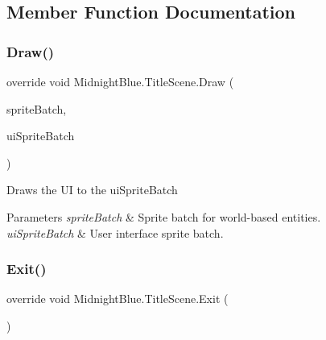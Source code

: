 \subsection{Member Function Documentation}
\hypertarget{class_midnight_blue_1_1_title_scene_a03fa806a36226ec5fd0ce09870109c18}{}\label{class_midnight_blue_1_1_title_scene_a03fa806a36226ec5fd0ce09870109c18} 
\subsubsection{\texorpdfstring{Draw()}{Draw()}}
{\footnotesize\ttfamily override void Midnight\+Blue.\+Title\+Scene.\+Draw (\begin{DoxyParamCaption}\item[{Sprite\+Batch}]{sprite\+Batch,  }\item[{Sprite\+Batch}]{ui\+Sprite\+Batch }\end{DoxyParamCaption})\hspace{0.3cm}{\ttfamily [inline]}}



Draws the UI to the ui\+Sprite\+Batch 


\begin{DoxyParams}{Parameters}
{\em sprite\+Batch} & Sprite batch for world-\/based entities.\\
\hline
{\em ui\+Sprite\+Batch} & User interface sprite batch.\\
\hline
\end{DoxyParams}
\hypertarget{class_midnight_blue_1_1_title_scene_aed29e37e9f849cc8f8443bae057a8eb8}{}\label{class_midnight_blue_1_1_title_scene_aed29e37e9f849cc8f8443bae057a8eb8} 
\subsubsection{\texorpdfstring{Exit()}{Exit()}}
{\footnotesize\ttfamily override void Midnight\+Blue.\+Title\+Scene.\+Exit (\begin{DoxyParamCaption}{ }\end{DoxyParamCaption})\hspace{0.3cm}{\ttfamily [inline]}}



